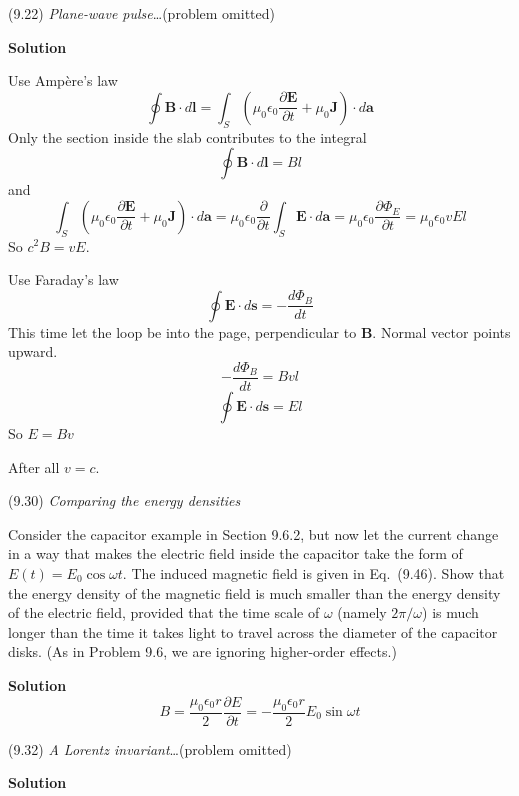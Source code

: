 \documentclass{article}
\begin{document}
\begin{homeworkProblem}
	(9.22) \textit{Plane-wave pulse}\ldots (problem omitted)

	\textbf{Solution}
	\begin{enumerate}[label = (\alph*)]
		\begin{item}
			Use Amp\`{e}re's law
			\[
				\oint\mathbf{B}\cdot d\mathbf{l}=\int_S\left(\mu_0\epsilon_0\frac{\partial\mathbf{E}}{\partial t}+\mu_0\mathbf{J}\right)\cdot d\mathbf{a}
			\]
			Only the section inside the slab contributes to the integral
			\[
				\oint\mathbf{B}\cdot d\mathbf{l}=Bl
			\]
			and
			\[
				\int_S\left(\mu_0\epsilon_0\frac{\partial\mathbf{E}}{\partial t}+\mu_0\mathbf{J}\right)\cdot d\mathbf{a}=\mu_0\epsilon_0\frac{\partial}{\partial t}\int_S\mathbf{E}\cdot d\mathbf{a}=\mu_0\epsilon_0\frac{\partial\Phi_E}{\partial t}=\mu_0\epsilon_0 vEl
			\]
			So $c^2B=vE$.
		\end{item}
		\begin{item}
			Use Faraday's law
			\[
				\oint\mathbf{E}\cdot d\mathbf{s}=-\frac{d\Phi_B}{dt}
			\]
			This time let the loop be into the page, perpendicular to $\mathbf{B}$. Normal vector points upward.
			\[
				-\frac{d\Phi_B}{dt}=Bvl
			\]
			\[
				\oint\mathbf{E}\cdot d\mathbf{s}=El
			\]
			So $E=Bv$
		\end{item}
	\end{enumerate}
	After all $v=c$.
\end{homeworkProblem}


\begin{homeworkProblem}
	(9.30) \textit{Comparing the energy densities}

	Consider the capacitor example in Section 9.6.2, but now let the current change in a way that makes the electric field inside the capacitor take the form of $E(t)=E_0\cos\omega t$. The induced magnetic field is given in Eq.~(9.46). Show that the energy density of the magnetic field is much smaller than the energy density of the electric field, provided that the time scale of $\omega$ (namely $2\pi/\omega$) is much longer than the time it takes light to travel across the diameter of the capacitor disks. (As in Problem 9.6, we are ignoring higher-order effects.)

	\textbf{Solution}
	\[
		B=\frac{\mu_0\epsilon_0r}{2}\frac{\partial E}{\partial t}=-\frac{\mu_0\epsilon_0r}{2}E_0\sin\omega t
	\]
\end{homeworkProblem}


\begin{homeworkProblem}
	(9.32) \textit{A Lorentz invariant}\ldots (problem omitted)

	\textbf{Solution}
\end{homeworkProblem}
\end{document}
